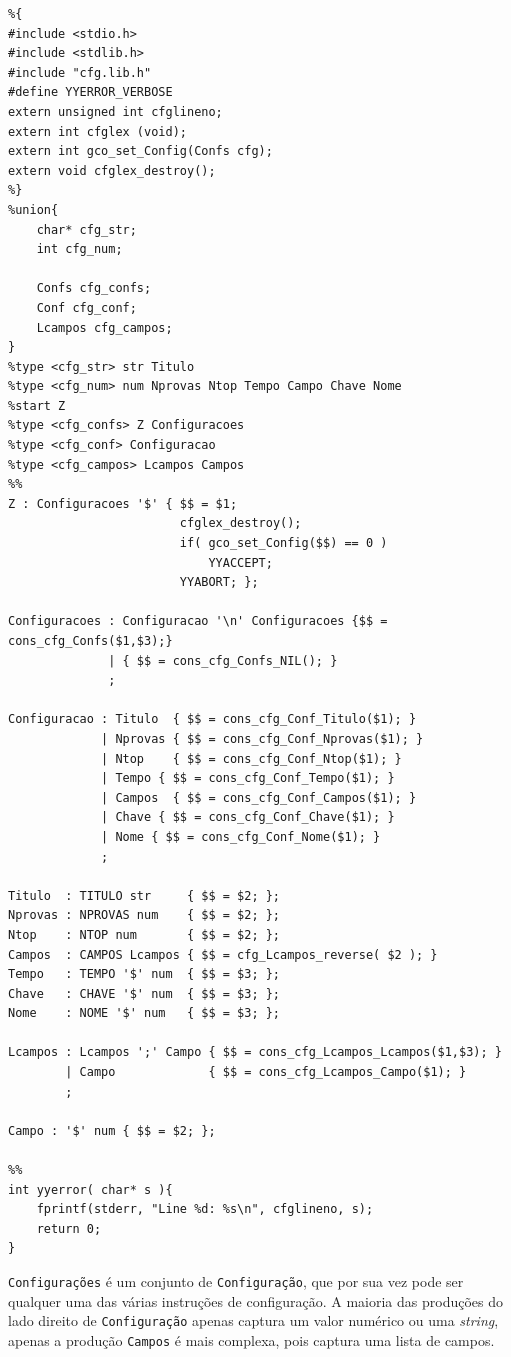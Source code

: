 \documentclass[11pt, a4paper, oneside]{article}
\begin{document}
\begin{lstlisting}[language={}, caption={Yacc do módulo de configuração.}]
%token TITULO NPROVAS NTOP CAMPOS TEMPO CHAVE NOME str num
%{
#include <stdio.h>
#include <stdlib.h>
#include "cfg.lib.h"
#define YYERROR_VERBOSE
extern unsigned int cfglineno;
extern int cfglex (void);
extern int gco_set_Config(Confs cfg);
extern void cfglex_destroy();
%}
%union{
    char* cfg_str;
    int cfg_num;
    
    Confs cfg_confs;
    Conf cfg_conf;
    Lcampos cfg_campos;
}
%type <cfg_str> str Titulo
%type <cfg_num> num Nprovas Ntop Tempo Campo Chave Nome
%start Z
%type <cfg_confs> Z Configuracoes
%type <cfg_conf> Configuracao
%type <cfg_campos> Lcampos Campos
%%
Z : Configuracoes '$' { $$ = $1;
                        cfglex_destroy();
                        if( gco_set_Config($$) == 0 )
                            YYACCEPT;
                        YYABORT; };

Configuracoes : Configuracao '\n' Configuracoes {$$ = cons_cfg_Confs($1,$3);}
              | { $$ = cons_cfg_Confs_NIL(); }
              ;

Configuracao : Titulo  { $$ = cons_cfg_Conf_Titulo($1); }
             | Nprovas { $$ = cons_cfg_Conf_Nprovas($1); }
             | Ntop    { $$ = cons_cfg_Conf_Ntop($1); }
             | Tempo { $$ = cons_cfg_Conf_Tempo($1); }
             | Campos  { $$ = cons_cfg_Conf_Campos($1); }
             | Chave { $$ = cons_cfg_Conf_Chave($1); }
             | Nome { $$ = cons_cfg_Conf_Nome($1); }
             ;

Titulo  : TITULO str     { $$ = $2; };
Nprovas : NPROVAS num    { $$ = $2; };
Ntop    : NTOP num       { $$ = $2; };
Campos  : CAMPOS Lcampos { $$ = cfg_Lcampos_reverse( $2 ); }
Tempo   : TEMPO '$' num  { $$ = $3; };
Chave   : CHAVE '$' num  { $$ = $3; };
Nome    : NOME '$' num   { $$ = $3; };

Lcampos : Lcampos ';' Campo { $$ = cons_cfg_Lcampos_Lcampos($1,$3); }
        | Campo             { $$ = cons_cfg_Lcampos_Campo($1); }
        ;

Campo : '$' num { $$ = $2; };

%%
int yyerror( char* s ){
    fprintf(stderr, "Line %d: %s\n", cfglineno, s);
    return 0;
}
\end{lstlisting} 

\texttt{Configurações} é um conjunto de \texttt{Configuração}, que por sua vez pode ser qualquer uma das várias instruções de configuração. A maioria das produções do lado direito de \texttt{Configuração} apenas captura um valor numérico ou uma \textit{string}, apenas a produção \texttt{Campos} é mais complexa, pois captura uma lista de campos.
\end{document}

